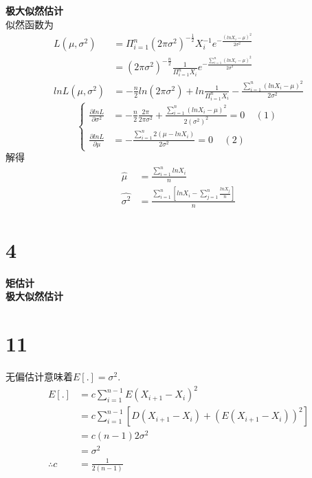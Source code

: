 \documentclass[a4paper,twocolumn]{ctexart}
\begin{document}
\noindent\textbf{极大似然估计}\\
似然函数为
\begin{align*}
L(\mu,\sigma^2)&=\Pi_{i=1}^{n}(2\pi \sigma^2)^{-\frac{1}{2}}X_i^{-1}e^{-\frac{(lnX_i-\mu)^2}{2\sigma^2}}\\
&=(2\pi\sigma^2)^{-\frac{n}{2}}\frac{1}{\Pi_{i=1}^{n}X_i}e^{-\frac{\sum_{i=1}^{n}(lnX_i-\mu)^2}{2\sigma^2}}\\
lnL(\mu,\sigma^2)&=-\frac{n}{2}ln(2\pi\sigma^2)+ln\frac{1}{\Pi_{i=1}^{n}X_i}-\frac{\sum_{i=1}^{n}(lnX_i-\mu)^2}{2\sigma^2}
\end{align*}
\[
\begin{cases}
\frac{\partial lnL}{\partial \sigma^2}&=-\frac{n}{2}\frac{2\pi}{2\pi\sigma^2}+\frac{\sum_{i=1}^{n}(lnX_i-\mu)^2}{2(\sigma^2)^2}=0~~~~~(1)\\
\frac{\partial lnL}{\partial \mu}&=-\frac{\sum_{i=1}^{n}2(\mu-lnX_i)}{2\sigma^2}=0~~~~~(2)
\end{cases}
\]
解得
\begin{align*}
\hat{\mu}&=\frac{\sum_{i=1}^{n}lnX_i}{n}\\
\hat{\sigma^2}&=\frac{\sum_{i=1}^{n}\left[lnX_i-\sum_{j=1}^{n}\frac{lnX_j}{n}\right]}{n}
\end{align*}
\section*{4}
\noindent\textbf{矩估计}\\

\noindent\textbf{极大似然估计}\\
\section*{11}
无偏估计意味着$E[.]=\sigma^2$.\\
\begin{align*}
E[.]&=c\sum_{i=1}^{n-1}E(X_{i+1}-X_i)^2\\
&=c\sum_{i=1}^{n-1}\left[D(X_{i+1}-X_i)+(E(X_{i+1}-X_i))^2\right]\\
&=c(n-1)2\sigma^2\\
&=\sigma^2\\
\therefore c&=\frac{1}{2(n-1)}
\end{align*}
\end{document}
